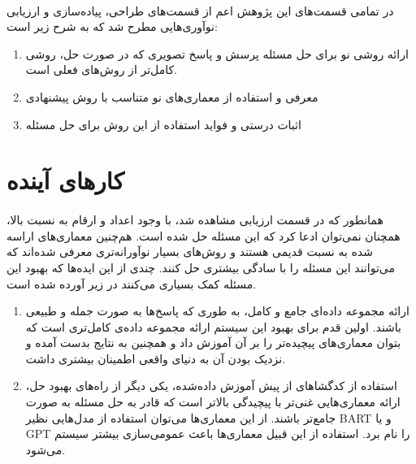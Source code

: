 \paragraph{}
{
      در تمامی قسمت‌های این پژوهش اعم از قسمت‌های طراحی، پیاده‌سازی و ارزیابی نوآوری‌هایی مطرح شد که به شرح زیر است:
      \begin{enumerate}
            \item {
                        ارائه روشی نو برای حل مسئله پرسش و پاسخ تصویری که در صورت حل، روشی کامل‌تر از روش‌های فعلی است. 
            }
            \item {
                        معرفی و استفاده از معماری‌های نو متناسب با روش پیشنهادی
                  }
            \item{
                        اثبات درستی و فواید استفاده از این روش برای حل مسئله
            }
      \end{enumerate}
}

\section{کارهای آینده}
\paragraph{}
{
      همانطور که در قسمت ارزیابی مشاهده شد، با وجود اعداد و ارقام به نسبت بالا، همچنان نمی‌توان ادعا کرد که 
      این مسئله حل شده است. هم‌چنین معماری‌های اراسه شده به نسبت قدیمی هستند و روش‌های بسیار نوآورانه‌تری معرفی 
      شده‌اند که می‌توانند این مسئله را با سادگی بیشتری حل کنند. 
      چندی از این ایده‌ها که بهبود این مسئله کمک بسیاری می‌کنند در زیر آورده شده است.
      \begin{enumerate}
            \item {
                  ارائه مجموعه داده‌ای جامع و کامل، به طوری که 
                  پاسخ‌ها به صورت جمله و طبیعی باشند. اولین قدم برای
                  بهبود این سیستم ارائه مجموعه داده‌ی کامل‌تری 
                  است که بتوان معماری‌های پیچیده‌تر را بر آن آموزش داد 
                  و همچنین به نتایج بدست آمده و نزدیک بودن آن به دنیای واقعی اطمینان بیشتری داشت. 
            }
            \item {
                  استفاده از کدگشا‌های از پیش‌ آموزش داده‌شده، یکی دیگر از راه‌های بهبود حل، ارائه معماری‌هایی غنی‌تر 
                  با پیچیدگی بالاتر است که قادر به حل مسئله‌ به صورت جامع‌تر باشند. از این معماری‌ها می‌توان استفاده از 
                  مدل‌هایی نظیر 
                  BART
                  و یا 
                  GPT 
                  را نام برد. استفاده از این قبیل معماری‌ها باعث عمومی‌سازی بیشتر سیستم می‌شود. 
            }
      \end{enumerate}
}